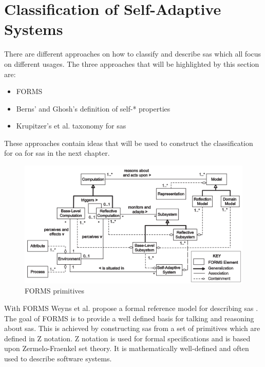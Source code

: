 \newpage
\section{Classification of Self-Adaptive Systems}
\label{ch:SASClassification}

There are different approaches on how to classify and describe \acrshort{sas} which all focus on different usages.
The three approaches that will be highlighted by this section are:
\begin{itemize}[nosep]
    \item FORMS \cite*{FORMS}
    \item Berns' and Ghosh's definition of self-* properties \cite*{DissectingSelfProperties}
    \item Krupitzer's et al. taxonomy for \acrshort{sas} \cite*{SurveyOnEngineeringApproaches}
\end{itemize} 
These approaches contain ideas that will be used to construct the classification for
\acrshort{oa} for \acrshort{sas} in the next chapter.

\begin{figure}[b!]
    \centering
    \includegraphics[width=\textwidth]{images/FORMS.png}
    \caption{FORMS primitives \cite*{FORMS}}
    \label{fig:FORMS}
\end{figure}

\noindent With FORMS Weyns et al. propose a formal reference model for describing \acrshort{sas} \cite{FORMS}.
The goal of FORMS is to provide a well defined basis for talking and reasoning about \acrshort{sas}.
This is achieved by constructing \acrshort{sas} from a set of primitives which are defined in Z notation.
Z notation is used for formal specifications and is based upon Zermelo-Fraenkel set theory.
It is mathematically well-defined and often used to describe software systems.

